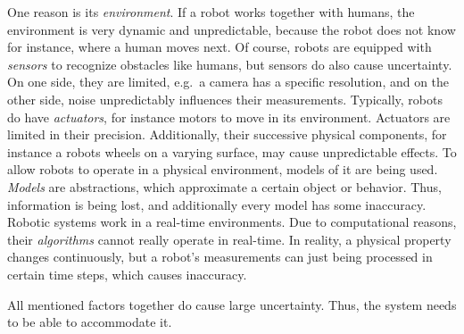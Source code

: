 One reason is its \emph{environment}. If a robot works together with humans, the environment is very dynamic and unpredictable, because the robot does not know for instance, where a human moves next. Of course, robots are equipped with \emph{sensors} to recognize obstacles like humans, but sensors do also cause uncertainty. On one side, they are limited, e.g.\ a camera has a specific resolution, and on the other side, noise unpredictably influences their measurements. Typically, robots do have \emph{actuators}, for instance motors to move in its environment. Actuators are limited in their precision. Additionally, their successive physical components, for instance a robots wheels on a varying surface, may cause unpredictable effects. To allow robots to operate in a physical environment, models of it are being used. \emph{Models} are abstractions, which approximate a certain object or behavior.  Thus, information is being lost, and additionally every model has some inaccuracy. Robotic systems work in a real-time environments. Due to computational reasons, their \emph{algorithms} cannot really operate in real-time. In reality, a physical property changes continuously, but a robot's measurements can just being processed in certain time steps, which causes inaccuracy. 

All mentioned factors together do cause large uncertainty. Thus, the system needs to be able to accommodate it.


